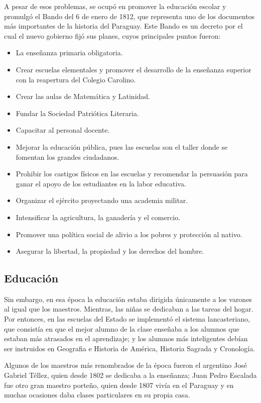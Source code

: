 \documentclass{article}
\begin{document}
A pesar de esos problemas, se ocupó en promover la educación escolar y
promulgó el Bando del 6 de enero de 1812, que representa uno de los documentos 
más importantes de la historia del Paraguay. Este Bando es un decreto por el cual
el nuevo gobierno fijó sus planes, cuyos principales puntos fueron:

\begin{itemize}
    \item La enseñanza primaria obligatoria.
    \item Crear escuelas elementales y promover el desarrollo de la enseñanza superior
con la reapertura del Colegio Carolino.
    \item Crear las aulas de Matemática y Latinidad.
    \item Fundar la Sociedad Patriótica Literaria.
    \item Capacitar al personal docente.
    \item Mejorar la educación pública, pues las escuelas son el taller donde se
fomentan los grandes ciudadanos.
    \item Prohibir los castigos físicos en las escuelas y recomendar la persuasión
para ganar el apoyo de los estudiantes en la labor educativa.
    \item Organizar el ejército proyectando una academia militar.
    \item Intensificar la agricultura, la ganadería y el comercio.
    \item Promover una política social de alivio a los pobres y protección al nativo.
    \item Asegurar la libertad, la propiedad y los derechos del hombre.
\end{itemize}

  \subsection*{Educación}
  
Sin embargo, en esa época la educación estaba dirigida únicamente a los
varones al igual que los maestros. Mientras, las niñas se dedicaban a las
tareas del hogar. Por entonces, en las escuelas del Estado se implementó
el sistema lancasteriano, que consistía en que el mejor alumno de la clase
enseñaba a los alumnos que estaban más atrasados en el aprendizaje; y 
los alumnos más inteligentes debían ser instruidos en Geografia e Historia
de América, Historia Sagrada y Cronología.

Algunos de los maestros más renombrados de la época fueron el argentino
José Gabriel Téllez, quien desde 1802 se dedicaba a la enseñanza; Juan
Pedro Escalada fue otro gran maestro porteño, quien desde 1807 vivía en el
Paraguay y en muchas ocasiones daba clases particulares en su propia casa.
\end{document}
